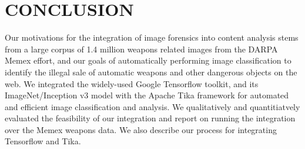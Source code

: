 \section{CONCLUSION} \label{sec:future}
Our motivations for the integration of image forensics into content analysis stems from a large corpus of 1.4 million weapons related images from the DARPA Memex effort, and our goals of automatically performing image classification to identify the illegal sale of automatic weapons and other dangerous objects on the web. We integrated the widely-used Google Tensorflow toolkit, and its ImageNet/Inception v3 model with the Apache Tika framework for automated and efficient image classification and analysis. We qualitatively and quantitiatvely evaluated the feasibility of our integration and report on running the integration over the Memex weapons data. We also describe our process for integrating Tensorflow and Tika. 
